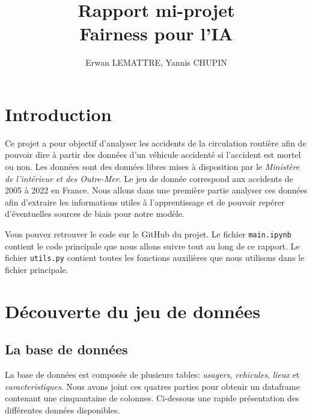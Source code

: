 \documentclass[]{article}
\author{Erwan LEMATTRE, Yannis CHUPIN}
\title{Rapport mi-projet\\Fairness pour l'IA}
\begin{document}
    \maketitle
    \newpage
    \tableofcontents
    \newpage

    \section{Introduction}
    Ce projet a pour objectif d'analyser les accidents de la circulation routière afin de pouvoir dire 
    à partir des données d'un véhicule accidenté si l'accident est mortel ou non.
    Les données sont des données libres mises à disposition par le \textit{Ministère de l'intérieur et des 
    Outre-Mer}. Le jeu de donnée correspond aux accidents de 2005 à 2022 en France. Nous allons dans une première 
    partie analyser ces données afin d'extraire les informations utiles à l'apprentissage et de pouvoir repérer 
    d'éventuelles sources de biais pour notre modèle.
    
    Vous pouvez retrouver le code sur le GitHub du projet. Le fichier \texttt{main.ipynb} contient 
    le code principale que nous allons suivre tout au long de ce rapport. Le fichier \texttt{utils.py} 
    contient toutes les fonctions auxilières que nous utilisons dans le fichier principale.

    \section{Découverte du jeu de données}
    \subsection{La base de données}
    La base de données est composée de plusieurs tables: \textit{usagers}, \textit{vehicules}, \textit{lieux} et 
    \textit{caracteristiques}. Nous avons joint ces quatres parties pour obtenir un dataframe contenant une 
    cinquantaine de colonnes. 
    Ci-dessous une rapide présentation des différentes données disponibles.
\end{document}
